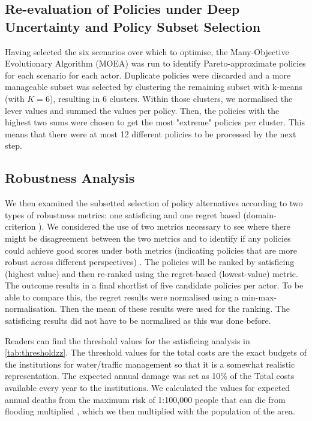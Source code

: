 \subsection{Re-evaluation of Policies under Deep Uncertainty and Policy Subset Selection}
Having selected the six scenarios over which to optimise, the Many-Objective Evolutionary Algorithm (MOEA) was run to identify Pareto-approximate policies for each scenario for each actor. Duplicate policies were discarded and a more manageable subset was selected by clustering the remaining subset with k-means (with $K=6$), resulting in 6 clusters. Within those clusters, we normalised the lever values and summed the values per policy. Then, the policies with the highest two sums were chosen to get the most "extreme" policies per cluster. This means that there were at most 12 different policies to be processed by the next step.

\subsection{Robustness Analysis}
We then examined the subsetted selection of policy alternatives according to two types of robustness metrics: one satisficing and one regret based (domain-criterion \parencite{bartholomew_considering_2020}). We considered the use of two metrics necessary to see where there might be disagreement between the two metrics and to identify if any policies could achieve good scores under both metrics (indicating policies that are more robust across different perspectives) \parencite{mcphail_robustness_2018}. The policies will be ranked by satisficing (highest value) and then re-ranked using the regret-based (lowest-value) metric. The outcome results in a final shortlist of five candidate policies per actor. To be able to compare this, the regret results were normalised using a min-max-normalisation. Then the mean of these results were used for the ranking. The satisficing results did not have to be normalised as this was done before. 

Readers can find the threshold values for the satisficing analysis in \autoref{tab:thresholdzz}. The threshold values for the total costs are the exact budgets of the institutions for water/traffic management so that it is a somewhat realistic representation. The expected annual damage was set as 10\% of the Total costs available every year to the institutions. We calculated the values for expected annual deaths from the maximum risk of 1:100,000 people that can die from flooding multiplied \parencite{slootjes_achtergronden_2016}, which we then multiplied with the population of the area.

